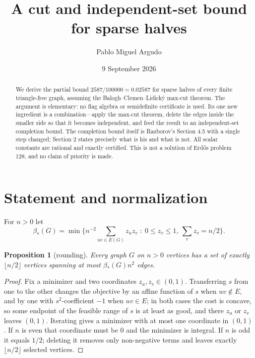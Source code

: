 \documentclass[11pt]{article}
\title{A cut and independent-set bound for sparse halves}
\author{Pablo Miguel Argudo}
\date{9 September 2026}
\newtheorem{proposition}{Proposition}
\theoremstyle{remark}
\newcommand{\bh}{\beta_*}
\begin{document}
\maketitle
\begin{abstract}
We derive the partial bound $2587/100000=0.02587$ for sparse halves of every
finite triangle-free graph, assuming the Balogh--Clemen--Lidick\'y max-cut
theorem. The argument is elementary: no flag algebra or semidefinite
certificate is used. Its one new ingredient is a combination---apply the
max-cut theorem, delete the edges inside the smaller side so that it becomes
independent, and feed the result to an independent-set completion bound. The
completion bound itself is Razborov's Section 4.5 with a single step changed;
Section 2 states precisely what is his and what is not. All scalar constants
are rational and exactly certified. This is not a solution of Erd\H{o}s
problem 128, and no claim of priority is made.
\end{abstract}

\section{Statement and normalization}
For $n>0$ let
\[
 \bh(G)=\min\Big\{n^{-2}\!\!\sum_{uv\in E(G)}\!\!z_uz_v \;:\;
   0\le z_v\le 1,\ \sum_v z_v=n/2\Big\}.
\]

\begin{proposition}[rounding]\label{round}
Every graph $G$ on $n>0$ vertices has a set of exactly $\lfloor n/2\rfloor$
vertices spanning at most $\bh(G)n^2$ edges.
\end{proposition}
\begin{proof}
Fix a minimizer and two coordinates $z_u,z_v\in(0,1)$. Transferring $s$ from
one to the other changes the objective by an affine function of $s$ when
$uv\notin E$, and by one with $s^2$-coefficient $-1$ when $uv\in E$; in both
cases the cost is concave, so some endpoint of the feasible range of $s$ is at
least as good, and there $z_u$ or $z_v$ leaves $(0,1)$. Iterating gives a
minimizer with at most one coordinate in $(0,1)$. If $n$ is even that
coordinate must be $0$ and the minimizer is integral. If $n$ is odd it equals
$1/2$; deleting it removes only non-negative terms and leaves exactly
$\lfloor n/2\rfloor$ selected vertices.
\end{proof}
\end{document}
